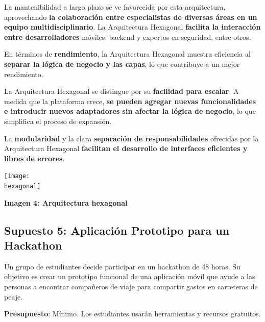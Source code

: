 \documentclass[a4paper]{article}
\newcommand{\hexagonal}{imagenes/hexagonal.png}
\begin{document}
    La mantenibilidad a largo plazo se ve favorecida por esta arquitectura, aprovechando \textbf{la colaboración entre especialistas de diversas áreas en un equipo multidisciplinario}. La Arquitectura Hexagonal \textbf{facilita la interacción entre desarrolladores} móviles, backend y expertos en seguridad, entre otros.\vspace{0.3cm}
    
    En términos de \textbf{rendimiento}, la Arquitectura Hexagonal muestra eficiencia al \textbf{separar la lógica de negocio y las capas}, lo que contribuye a un mejor rendimiento.\vspace{0.3cm}
    
    La Arquitectura Hexagonal se distingue por su \textbf{facilidad para escalar}. A medida que la plataforma crece, \textbf{se pueden agregar nuevas funcionalidades e introducir nuevos adaptadores sin afectar la lógica de negocio}, lo que simplifica el proceso de expansión.\vspace{0.3cm}
    
    La \textbf{modularidad} y la clara \textbf{separación de responsabilidades} ofrecidas por la Arquitectura Hexagonal \textbf{facilitan el desarrollo de interfaces eficientes y libres de errores}.
    
    \begin{center}
        \texttt{[image: \\hexagonal]}\vspace{0.2cm}\par
        \textbf{Imagen 4: Arquitectura hexagonal}
    \end{center}

    \newpage

    \subsection{Supuesto 5: Aplicación Prototipo para un Hackathon}

    Un grupo de estudiantes decide participar en un hackathon de 48 horas. Su objetivo es crear un prototipo funcional de una aplicación móvil que ayude a las personas a encontrar compañeros de viaje para compartir gastos en carreteras de
    peaje.\vspace{0.2cm}
    
    \textbf{Presupuesto}: Mínimo. Los estudiantes usarán herramientas y recursos gratuitos.\vspace{0.2cm}
    
\end{document}
